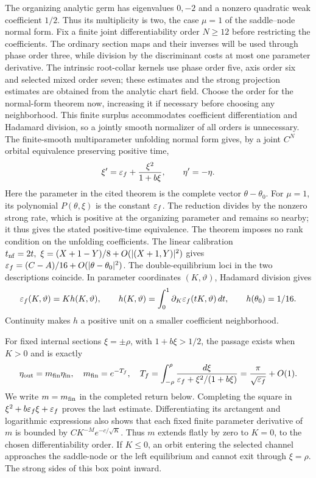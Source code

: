 The organizing analytic germ has eigenvalues $0,-2$ and a nonzero
quadratic weak coefficient $1/2$. Thus its multiplicity is two, the
case $\mu=1$ of the saddle--node normal form. Fix a finite joint
differentiability order \(N\ge12\) before restricting the coefficients.
The ordinary section maps and their inverses will be used through phase
order three, while division by the discriminant costs at most one
parameter derivative. The intrinsic root-collar kernels use phase order
five, axis order six and selected mixed order seven; these estimates and
the strong projection estimates are obtained from the analytic chart
field. Choose the order for the normal-form theorem now, increasing it
if necessary before choosing any neighborhood. This finite surplus
accommodates coefficient differentiation and Hadamard division, so a
jointly smooth normalizer of all orders is unnecessary.
The finite-smooth multiparameter unfolding normal form
\cite[Theorem~3 and formula~(2.2), October 2000 author copy p.~6]{DIR02} gives,
by a joint \(C^N\) orbital equivalence preserving positive time,
\begin{equation}\label{eq:finite-normalform}
 \xi'=\varepsilon_f+\frac{\xi^2}{1+b\xi},\qquad \eta'=-\eta .
\end{equation}
Here the parameter in the cited theorem is the complete vector
\(\theta-\theta_0\). For \(\mu=1\), its polynomial \(P(\theta,\xi)\)
is the constant \(\varepsilon_f\). The reduction divides by the nonzero strong
rate, which is positive at the organizing parameter and remains so
nearby; it thus gives the stated positive-time equivalence. The theorem
imposes no rank condition on the unfolding coefficients.
The linear calibration
\(t_{\rm nf}=2t,\ \xi=(X+1-Y)/8+O(|(X+1,Y)|^2)\) gives
\(\varepsilon_f=(C-A)/16+O(|\theta-\theta_0|^2)\).
The double-equilibrium loci in the two descriptions coincide.
In parameter coordinates \((K,\vartheta)\), Hadamard division gives
\[
 \varepsilon_f(K,\vartheta)=K h(K,\vartheta),\qquad
 h(K,\vartheta)=\int_0^1\partial_K\varepsilon_f(tK,\vartheta)\,dt,
 \qquad h(\theta_0)=1/16.
\]
Continuity makes \(h\) a positive unit on a smaller coefficient
neighborhood.

For fixed internal sections \(\xi=\pm\rho\), with \(1+b\xi>1/2\),
the passage exists when \(K>0\) and is exactly
\begin{equation}\label{eq:finite-multiplier}
 \eta_{\rm out}=m_{\rm fin}\eta_{\rm in},\quad
 m_{\rm fin}=e^{-T_f},\quad
 T_f=\int_{-\rho}^{\rho}
       \frac{d\xi}{\varepsilon_f+\xi^2/(1+b\xi)}
     =\frac{\pi}{\sqrt{\varepsilon_f}}+O(1).
\end{equation}
We write \(m=m_{\rm fin}\) in the completed return below.
Completing the square in \(\xi^2+b\varepsilon_f\xi+\varepsilon_f\) proves the last
estimate. Differentiating its arctangent and logarithmic expressions
also shows that each fixed finite parameter derivative of \(m\) is
bounded by \(CK^{-M}e^{-c/\sqrt K}\). Thus \(m\) extends flatly
by zero to \(K=0\), to the chosen differentiability order.
If \(K\le0\), an orbit entering the selected channel approaches the
saddle-node or the left equilibrium and cannot exit through
\(\xi=\rho\). The strong sides of this box point inward.

